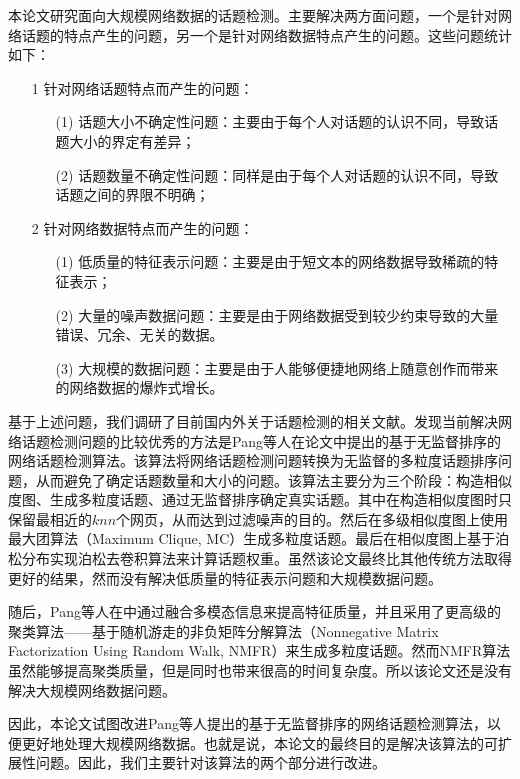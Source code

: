 本论文研究面向大规模网络数据的话题检测。主要解决两方面问题，一个是针对网络话题的特点产生的问题，另一个是针对网络数据特点产生的问题。这些问题统计如下：
\begin{enumerate}
	\item[1] 针对网络话题特点而产生的问题：
		\begin{enumerate}
			\item[(1)] 话题大小不确定性问题：主要由于每个人对话题的认识不同，导致话题大小的界定有差异；
			\item[(2)] 话题数量不确定性问题：同样是由于每个人对话题的认识不同，导致话题之间的界限不明确；
		\end{enumerate}
	\item[2] 针对网络数据特点而产生的问题：
		\begin{enumerate}
			\item[(1)] 低质量的特征表示问题：主要是由于短文本的网络数据导致稀疏的特征表示；
			\item[(2)] 大量的噪声数据问题：主要是由于网络数据受到较少约束导致的大量错误、冗余、无关的数据。
			\item[(3)] 大规模的数据问题：主要是由于人能够便捷地网络上随意创作而带来的网络数据的爆炸式增长。
		\end{enumerate}
\end{enumerate}

基于上述问题，我们调研了目前国内外关于话题检测的相关文献。发现当前解决网络话题检测问题的比较优秀的方法是Pang等人在论文\citep{pang-2013-unsupervised}中提出的基于无监督排序的网络话题检测算法。该算法将网络话题检测问题转换为无监督的多粒度话题排序问题，从而避免了确定话题数量和大小的问题。该算法主要分为三个阶段：构造相似度图、生成多粒度话题、通过无监督排序确定真实话题。其中在构造相似度图时只保留最相近的$knn$个网页，从而达到过滤噪声的目的。然后在多级相似度图上使用最大团算法（Maximum Clique, MC）生成多粒度话题。最后在相似度图上基于泊松分布实现泊松去卷积算法来计算话题权重。虽然该论文最终比其他传统方法取得更好的结果，然而没有解决低质量的特征表示问题和大规模数据问题。

随后，Pang等人在\citep{pang-tao-2016-lpd}中通过融合多模态信息来提高特征质量，并且采用了更高级的聚类算法——基于随机游走的非负矩阵分解算法（Nonnegative Matrix Factorization Using Random Walk, NMFR）来生成多粒度话题。然而NMFR算法虽然能够提高聚类质量，但是同时也带来很高的时间复杂度。所以该论文还是没有解决大规模网络数据问题。

因此，本论文试图改进Pang等人提出的基于无监督排序的网络话题检测算法，以便更好地处理大规模网络数据。也就是说，本论文的最终目的是解决该算法的可扩展性问题。因此，我们主要针对该算法的两个部分进行改进。

